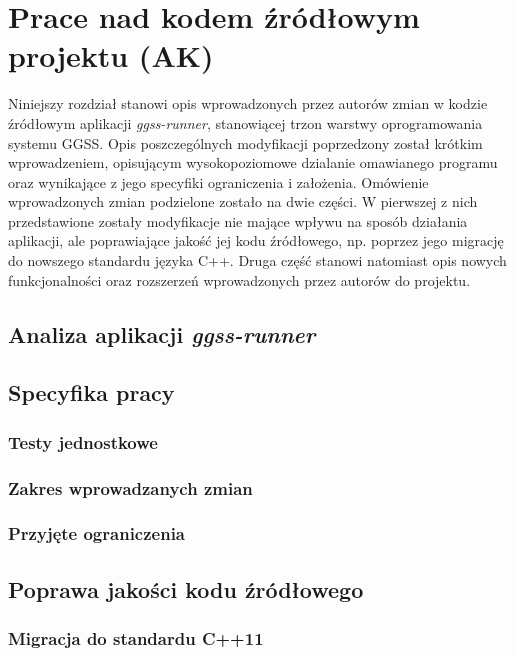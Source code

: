 \chapter{Prace nad kodem źródłowym projektu (AK)}
\label{cha:code}

Niniejszy rozdział stanowi opis wprowadzonych przez autorów zmian w kodzie źródłowym aplikacji \emph{ggss-runner}, stanowiącej trzon warstwy oprogramowania systemu GGSS. Opis poszczególnych modyfikacji poprzedzony został krótkim wprowadzeniem, opisującym wysokopoziomowe dzialanie omawianego programu oraz wynikające z jego specyfiki ograniczenia i założenia. Omówienie wprowadzonych zmian podzielone zostało na dwie części. W pierwszej z nich przedstawione zostały modyfikacje nie mające wpływu na sposób działania aplikacji, ale poprawiające jakość jej kodu źródłowego, np. poprzez jego migrację do nowszego standardu języka C++. Druga część stanowi natomiast opis nowych funkcjonalności oraz rozszerzeń wprowadzonych przez autorów do projektu. 

\section{Analiza aplikacji \emph{ggss-runner}}

\section{Specyfika pracy}

    \subsection{Testy jednostkowe} %
    \subsection{Zakres wprowadzanych zmian} %
    \subsection{Przyjęte ograniczenia} %

\section{Poprawa jakości kodu źródłowego}

    \subsection{Migracja do standardu C++11}
